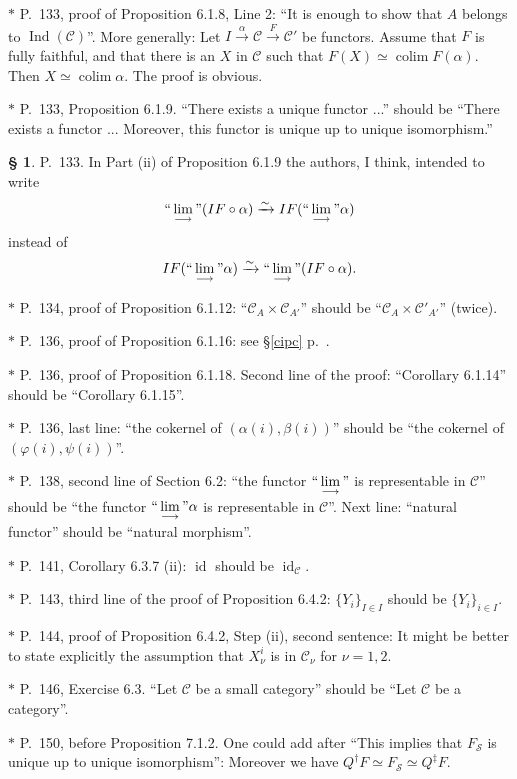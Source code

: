\documentclass[12pt]{article}
\theoremstyle{remark}
\theoremstyle{definition}
\newtheorem{s}[thm]{\S}
\newcommand{\nn}{\noindent}
\newcommand{\C}{\mathcal C}
\newcommand{\SSS}{\mathcal S}
\newcommand{\pp}{\varphi}
\newcommand{\ilim}{\operatornamewithlimits{\underset{\longrightarrow}{lim}}}
\DeclareMathOperator*{\colim}{colim}
\DeclareMathOperator{\id}{id}
\DeclareMathOperator{\Ind}{Ind}
\begin{document}
\nn$*$ P.~133, proof of Proposition 6.1.8, Line 2: ``It is enough to show that $A$ belongs to $\Ind(\C)$''. More generally: Let $I\xrightarrow{\alpha}\C\xrightarrow{F}\C'$ be functors. Assume that $F$ is fully faithful, and that there is an $X$ in $\C$ such that $F(X)\simeq\colim F(\alpha)$. Then $X\simeq\colim\alpha$. The proof is obvious.

\nn$*$ P.~133, Proposition 6.1.9. ``There exists a unique functor ...'' should be ``There exists a functor ... Moreover, this functor is unique up to unique isomorphism.''

\begin{s}\label{s133ii} 
P.~133. In Part (ii) of Proposition 6.1.9 the authors, I think, intended to write 
$$
``\ilim"(IF\circ\alpha)\xrightarrow\sim IF(``\ilim"\alpha)
$$
instead of 
$$
IF(``\ilim"\alpha)\xrightarrow\sim``\ilim"(IF\circ\alpha). 
$$ 
\end{s}

\nn$*$ P.~134, proof of Proposition 6.1.12: ``$\C_A\times\C_{A'}$'' should be ``$\C_A\times\C'_{A'}$'' (twice).

\nn$*$ P.~136, proof of Proposition 6.1.16: see \S\ref{cipc} p.~\pageref{cipc}.

\nn$*$ P.~136, proof of Proposition 6.1.18. Second line of the proof: ``Corollary 6.1.14'' should be ``Corollary 6.1.15''. 

\nn$*$ P.~136, last line: ``the cokernel of $(\alpha(i),\beta(i))$'' should be ``the cokernel of\linebreak $(\pp(i),\psi(i))$''. 

\nn$*$ P.~138, second line of Section 6.2: ``the functor $``\displaystyle\lim_{\longrightarrow}"$ is representable in $\C$'' should be ``the functor $``\displaystyle\lim_{\longrightarrow}"\alpha$ is representable in $\C$''. Next line: ``natural functor'' should be ``natural morphism''.

\nn$*$ P.~141, Corollary 6.3.7 (ii): $\id$ should be $\id_\C$.

\nn$*$ P.~143, third line of the proof of Proposition 6.4.2: $\{Y_i\}_{I\in I}$ should be $\{Y_i\}_{i\in I}$.

\nn$*$ P.~144, proof of Proposition 6.4.2, Step (ii), second sentence: It might be better to state explicitly the assumption that $X_\nu^i$ is in $\C_\nu$ for $\nu=1,2$. 

\nn$*$ P.~146, Exercise 6.3. ``Let $\C$ be a small category'' should be ``Let $\C$ be a category''.

\nn$*$ P.~150, before Proposition 7.1.2. One could add after ``This implies that $F_{\SSS}$ is unique up to unique isomorphism'': Moreover we have $Q^\dagger F\simeq F_{\SSS}\simeq Q^\ddagger F$.
\end{document}
